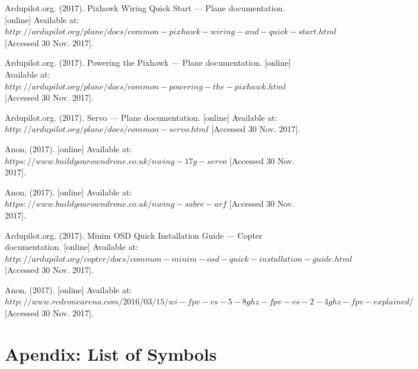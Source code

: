\documentclass[12pt]{article}
\begin{document}
\begin{thebibliography}{9}
Ardupilot.org. (2017). Pixhawk Wiring Quick Start — Plane documentation. [online] Available at: $http://ardupilot.org/plane/docs/common-pixhawk-wiring-and-quick-start.html$ [Accessed 30 Nov. 2017].

Ardupilot.org. (2017). Powering the Pixhawk — Plane documentation. [online] Available at: $http://ardupilot.org/plane/docs/common-powering-the-pixhawk.html$ [Accessed 30 Nov. 2017].

Ardupilot.org. (2017). Servo — Plane documentation. [online] Available at: $http://ardupilot.org/plane/docs/common-servo.html$ [Accessed 30 Nov. 2017].

Anon, (2017). [online] Available at: $https://www.buildyourowndrone.co.uk/ nwing-17g-servo$ [Accessed 30 Nov. 2017].

Anon, (2017). [online] Available at: $https://www.buildyourowndrone.co.uk/ nwing-sabre-arf$ [Accessed 30 Nov. 2017].

Ardupilot.org. (2017). Minim OSD Quick Installation Guide — Copter documentation. [online] Available at: $http://ardupilot.org/copter/docs/common-minim-osd-quick-installation-guide.html$ [Accessed 30 Nov. 2017].

Anon, (2017). [online] Available at: $http://www.rcdronearena.com/2016/03/15/wi -fpv-vs-5-8ghz-fpv-vs-2-4ghz- fpv-explained/$ [Accessed 30 Nov. 2017].
    
\end{thebibliography}

\appendix

\section{Apendix: List of Symbols}
\end{document}
